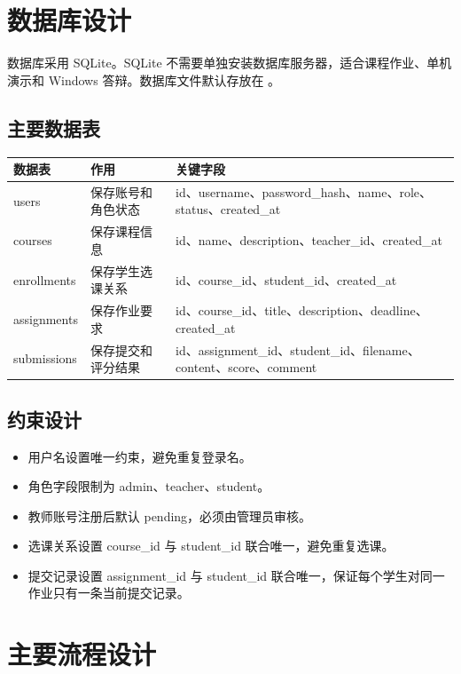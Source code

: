 \documentclass[UTF8,12pt]{ctexart}
\begin{document}
\newpage

\section{数据库设计}

数据库采用 SQLite。SQLite 不需要单独安装数据库服务器，适合课程作业、单机演示和 Windows 答辩。数据库文件默认存放在 。

\subsection{主要数据表}

\begin{longtable}{p{2.6cm}p{3cm}p{8cm}}
\toprule
数据表 & 作用 & 关键字段 \\
\midrule
users & 保存账号和角色状态 & id、username、password\_hash、name、role、status、created\_at \\
courses & 保存课程信息 & id、name、description、teacher\_id、created\_at \\
enrollments & 保存学生选课关系 & id、course\_id、student\_id、created\_at \\
assignments & 保存作业要求 & id、course\_id、title、description、deadline、created\_at \\
submissions & 保存提交和评分结果 & id、assignment\_id、student\_id、filename、content、score、comment \\
\bottomrule
\end{longtable}

\subsection{约束设计}

\begin{itemize}
  \item 用户名设置唯一约束，避免重复登录名。
  \item 角色字段限制为 admin、teacher、student。
  \item 教师账号注册后默认 pending，必须由管理员审核。
  \item 选课关系设置 course\_id 与 student\_id 联合唯一，避免重复选课。
  \item 提交记录设置 assignment\_id 与 student\_id 联合唯一，保证每个学生对同一作业只有一条当前提交记录。
\end{itemize}

\newpage

\section{主要流程设计}
\end{document}
